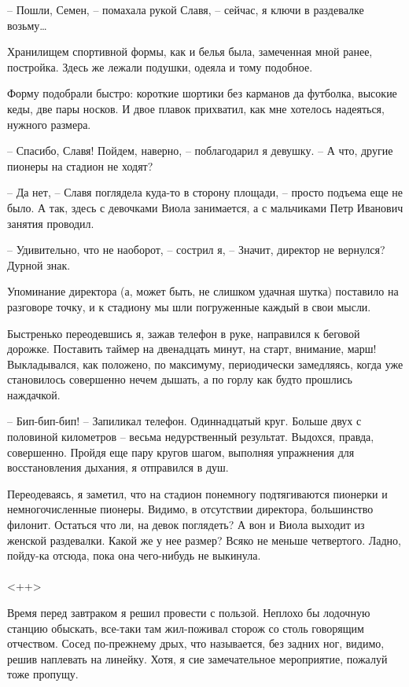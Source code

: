 \documentclass[a4paper]{book}
\begin{document}
-- Пошли, Семен, -- помахала рукой Славя, -- сейчас, я ключи в раздевалке возьму\ldots

Хранилищем спортивной формы, как и белья была, замеченная мной ранее, постройка. Здесь же лежали подушки, одеяла и тому подобное. 

Форму подобрали быстро: короткие шортики без карманов да футболка, высокие кеды, две пары носков. И двое плавок прихватил, как мне хотелось надеяться, нужного размера.

-- Спасибо, Славя! Пойдем, наверно, -- поблагодарил я девушку. -- А что, другие пионеры на стадион не ходят?

-- Да нет, -- Славя поглядела куда-то в сторону площади, -- просто подъема еще не было. А так, здесь с девочками Виола занимается, а с мальчиками Петр Иванович занятия проводил.

-- Удивительно, что не наоборот, -- сострил я, -- Значит, директор не вернулся? Дурной знак. 

Упоминание директора (а, может быть, не слишком удачная шутка) поставило на разговоре точку, и к стадиону мы шли погруженные каждый в свои мысли. 

Быстренько переодевшись я, зажав телефон в руке, направился к беговой дорожке. Поставить таймер на двенадцать минут, на старт, внимание, марш! Выкладывался, как положено, по максимуму, периодически замедляясь, когда уже становилось совершенно нечем дышать, а по горлу как будто прошлись наждачкой.

-- Бип-бип-бип! -- Запиликал телефон. Одиннадцатый круг. Больше двух с половиной километров -- весьма недурственный результат. Выдохся, правда, совершенно. Пройдя еще пару кругов шагом, выполняя упражнения для восстановления дыхания, я отправился в душ. 

Переодеваясь, я заметил, что на стадион понемногу подтягиваются пионерки и немногочисленные пионеры. Видимо, в отсутствии директора, большинство филонит. Остаться что ли, на девок поглядеть? А вон и Виола выходит из женской раздевалки. Какой же у нее размер? Всяко не меньше четвертого. Ладно, пойду-ка отсюда, пока она чего-нибудь не выкинула.

\paragraph{}<++>

Время перед завтраком я решил провести с пользой. Неплохо бы лодочную станцию обыскать, все-таки там жил-поживал сторож со столь говорящим отчеством. Сосед по-прежнему дрых, что называется, без задних ног, видимо, решив наплевать на линейку. Хотя, я сие замечательное мероприятие, пожалуй тоже пропущу. 
\end{document}
